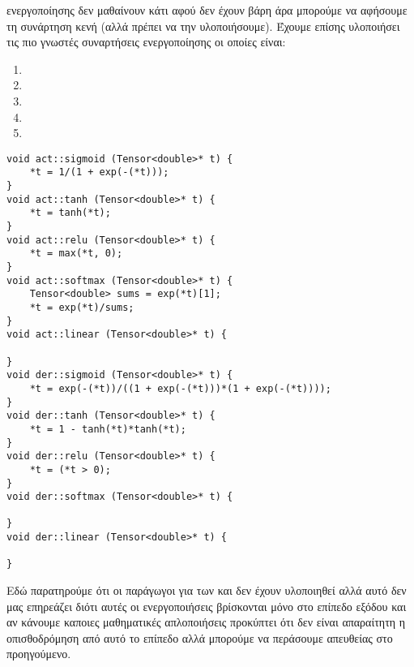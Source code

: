 ενεργοποίησης δεν μαθαίνουν κάτι αφού δεν έχουν βάρη άρα μπορούμε να αφήσουμε τη συνάρτηση κενή (αλλά πρέπει να την υλοποιήσουμε). Έχουμε επίσης υλοποιήσει τις πιο γνωστές συναρτήσεις ενεργοποίησης οι οποίες είναι:
\begin{enumerate}
    \item {}
    \item {}
    \item {}
    \item {}
    \item {}
\end{enumerate}
\begin{otherlanguage}{english}
\begin{lstlisting}[style=cppstyle,caption= Activation functions]
void act::sigmoid (Tensor<double>* t) {
    *t = 1/(1 + exp(-(*t)));
}
void act::tanh (Tensor<double>* t) {
    *t = tanh(*t);
}
void act::relu (Tensor<double>* t) {
    *t = max(*t, 0);
}
void act::softmax (Tensor<double>* t) {
    Tensor<double> sums = exp(*t)[1];
    *t = exp(*t)/sums;
}
void act::linear (Tensor<double>* t) {

}
void der::sigmoid (Tensor<double>* t) {
    *t = exp(-(*t))/((1 + exp(-(*t)))*(1 + exp(-(*t))));
}
void der::tanh (Tensor<double>* t) {
    *t = 1 - tanh(*t)*tanh(*t);
}
void der::relu (Tensor<double>* t) {
    *t = (*t > 0);
}
void der::softmax (Tensor<double>* t) {

}
void der::linear (Tensor<double>* t) {

}
\end{lstlisting}
\end{otherlanguage}
Εδώ παρατηρούμε ότι οι παράγωγοι για των  και  δεν έχουν υλοποιηθεί αλλά αυτό δεν μας επηρεάζει διότι αυτές οι ενεργοποιήσεις βρίσκονται μόνο στο επίπεδο εξόδου και αν κάνουμε καποιες μαθηματικές απλοποιήσεις
προκύπτει ότι δεν είναι απαραίτητη η οπισθοδρόμηση από αυτό το επίπεδο αλλά μπορούμε να περάσουμε απευθείας στο προηγούμενο.

